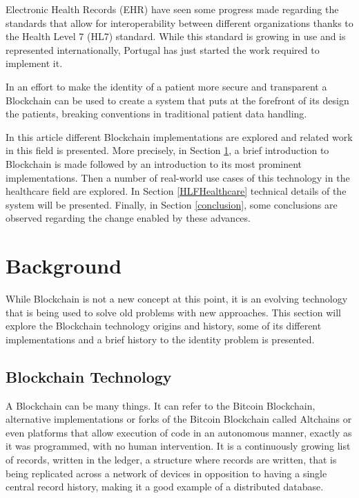 \documentclass[]{llncs}
\begin{document}
Electronic Health Records (EHR) have seen some progress made regarding the standards that allow for 
interoperability between different organizations thanks to the Health Level 7 (HL7) standard. 
While this standard is growing in use and is represented internationally, Portugal has just started 
the work required to implement it.
\cite{HealthLevel7}

In an effort to make the identity of a patient more secure and transparent a Blockchain can be used to create a 
system that puts at the forefront of its design the patients, breaking conventions in traditional patient data handling.

In this article different Blockchain implementations are explored and related work in this field is presented. 
More precisely, in Section \ref{background}, a brief introduction to Blockchain is made followed by an introduction 
to its most prominent implementations. Then a number of real-world use cases of this technology in the healthcare field 
are explored. In Section \ref{HLFHealthcare} technical details of the system will be presented. 
Finally, in Section \ref{conclusion},  some conclusions are observed regarding the change enabled by these advances.



\section{Background} \label{background}

While Blockchain is not a new concept at this point, it is an evolving technology that is 
being used to solve old problems with new approaches. This section will explore the Blockchain technology 
origins and history, some of its different implementations and a brief history to the identity problem is presented.

\subsection{Blockchain Technology}

A Blockchain can be many things. It can refer to the Bitcoin Blockchain, alternative implementations 
or forks of the Bitcoin Blockchain called Altchains or even platforms that allow execution of code 
in an autonomous manner, exactly as it was programmed, with no human intervention. 
It is a continuously growing list of records, written in the ledger, a structure where records are
written, that is being replicated across a network of devices in opposition to having a 
single central record history, making it a good example of a distributed database.
\cite{Wood2017}
  
\end{document}
